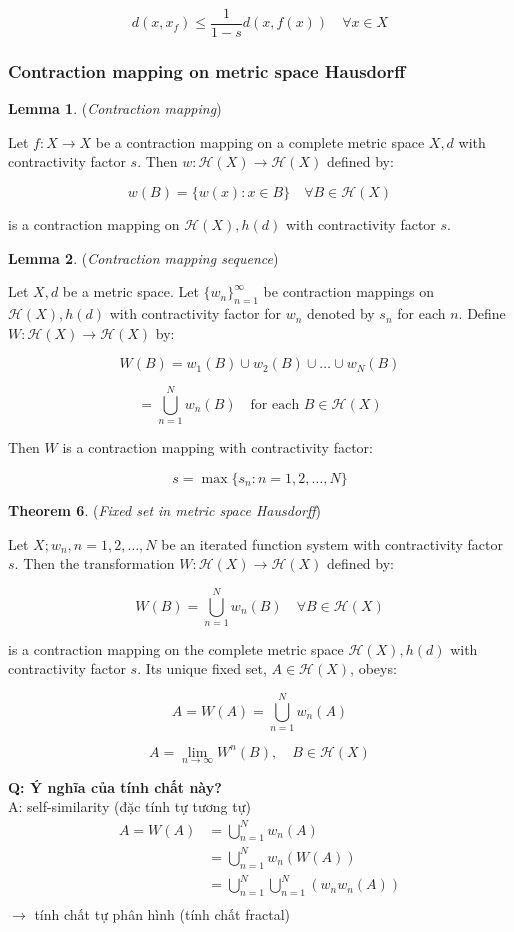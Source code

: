 \[
d(x, x_f) \leq \frac{1}{1 - s} d(x, f(x)) \quad \forall x \in X
\]

\pagebreak
\subsubsection{Contraction mapping on metric space Hausdorff}

\textbf{Lemma 1}. (\textit{Contraction mapping})

Let \(f: X \rightarrow X\) be a contraction mapping on a complete metric space \(X, d\) with contractivity factor \(s\). Then \(w: \mathcal{H}(X) \rightarrow \mathcal{H}(X)\) defined by:

\[
w(B) = \{w(x) : x \in B\} \quad \forall B \in \mathcal{H}(X)
\]

is a contraction mapping on \(\mathcal{H}(X), h(d)\) with contractivity factor \(s\).

\textbf{Lemma 2}. (\textit{Contraction mapping sequence})

Let \(X, d\) be a metric space. Let \(\{w_n\}_{n=1}^\infty\) be contraction mappings on \(\mathcal{H}(X), h(d)\) with contractivity factor for \(w_n\) denoted by \(s_n\) for each \(n\). Define \(W: \mathcal{H}(X) \rightarrow \mathcal{H}(X)\) by:

\[
W(B) = w_1(B) \cup w_2(B) \cup \ldots \cup w_N(B)
\]

\[
= \bigcup_{n=1}^N w_n(B) \quad \text{for each } B \in \mathcal{H}(X)
\]

Then \(W\) is a contraction mapping with contractivity factor:

\[
s = \max\{s_n : n = 1, 2, \ldots, N\}
\]

\textbf{Theorem 6}. (\textit{Fixed set in metric space Hausdorff})

Let $X; w_n, n = 1,2, \ldots, N$ be an iterated function system with contractivity factor \(s\). Then the transformation \(W: \mathcal{H}(X) \rightarrow \mathcal{H}(X)\) defined by:

\[
W(B) = \bigcup_{n=1}^N w_n(B) \quad \forall B \in \mathcal{H}(X)
\]

is a contraction mapping on the complete metric space \(\mathcal{H}(X), h(d)\) with contractivity factor \(s\). Its unique fixed set, \(A \in \mathcal{H}(X)\), obeys:

\[
A = W(A) = \bigcup_{n=1}^N w_n(A)
\]

\[
A = \lim_{n \to \infty} W^n(B), \quad B \in \mathcal{H}(X)
\]

\textbf{Q: Ý nghĩa của tính chất này?}\\
A: self-similarity (đặc tính tự tương tự)
\begin{align*}
    A = W(A)
    &= \bigcup_{n=1}^N w_n(A)\\
    &= \bigcup_{n=1}^N w_n(W(A))\\
    &= \bigcup_{n=1}^N\bigcup_{n=1}^N (w_n w_n(A))\\
\end{align*}
$\rightarrow$ tính chất tự phân hình (tính chất fractal)

